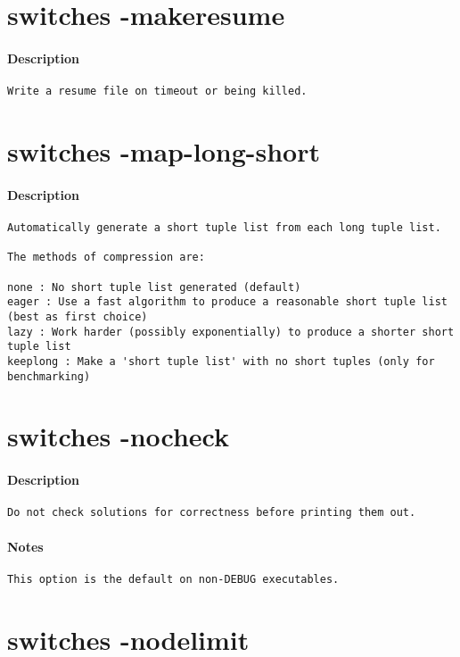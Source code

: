 \section{switches -makeresume}
\paragraph{Description}
{\footnotesize
\begin{verbatim}
Write a resume file on timeout or being killed.
\end{verbatim}
}
\section{switches -map-long-short}
\paragraph{Description}
{\footnotesize
\begin{verbatim}
Automatically generate a short tuple list from each long tuple list.

The methods of compression are:

none : No short tuple list generated (default)
eager : Use a fast algorithm to produce a reasonable short tuple list (best as first choice)
lazy : Work harder (possibly exponentially) to produce a shorter short tuple list
keeplong : Make a 'short tuple list' with no short tuples (only for benchmarking)
\end{verbatim}
}
\section{switches -nocheck}
\paragraph{Description}
{\footnotesize
\begin{verbatim}
Do not check solutions for correctness before printing them out.
\end{verbatim}
}
\paragraph{Notes}
{\footnotesize
\begin{verbatim}
This option is the default on non-DEBUG executables.
\end{verbatim}
}
\section{switches -nodelimit}
